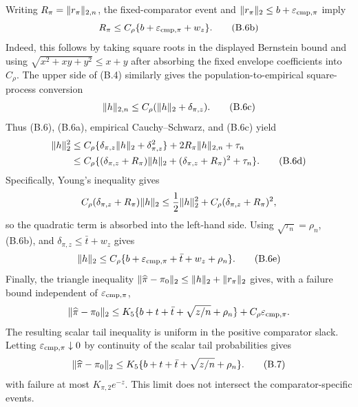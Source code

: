 Writing \(R_\pi=\lVert r_\pi\rVert_{2,n}\), the fixed-comparator event and
\(\lVert r_\pi\rVert_2\le b+\varepsilon_{\rm cmp,\pi}\) imply
\begin{equation}
 R_\pi\le C_\rho\{b+\varepsilon_{\rm cmp,\pi}+w_z\}.
 \tag{B.6b}
\end{equation}
Indeed, this follows by taking square roots in the displayed Bernstein bound
and using \(\sqrt{x^2+xy+y^2}\le x+y\) after absorbing the fixed envelope
coefficients into \(C_\rho\).  The upper side of (B.4) similarly gives the
population-to-empirical square-process conversion
\begin{equation}
 \lVert h\rVert_{2,n}\le C_\rho(\lVert h\rVert_2+\delta_{\pi,z}).
 \tag{B.6c}
\end{equation}
Thus (B.6), (B.6a), empirical Cauchy--Schwarz, and (B.6c) yield
\begin{align}
 \lVert h\rVert_2^2
 &\le C_\rho\{\delta_{\pi,z}\lVert h\rVert_2+\delta_{\pi,z}^2\}
      +2R_\pi\lVert h\rVert_{2,n}+\tau_n \nonumber\\
 &\le C_\rho\{(\delta_{\pi,z}+R_\pi)\lVert h\rVert_2
              +(\delta_{\pi,z}+R_\pi)^2+\tau_n\}.
 \tag{B.6d}
\end{align}
Specifically, Young's inequality gives
\[
 C_\rho(\delta_{\pi,z}+R_\pi)\lVert h\rVert_2
 \le \frac12\lVert h\rVert_2^2
      +C_\rho(\delta_{\pi,z}+R_\pi)^2,
\]
so the quadratic term is absorbed into the left-hand side.  Using
\(\sqrt{\tau_n}=\rho_n\), (B.6b), and
\(\delta_{\pi,z}\le\bar t+w_z\) gives
\begin{equation}
 \lVert h\rVert_2\le C_\rho\{b+\varepsilon_{\rm cmp,\pi}
                         +\bar t+w_z+\rho_n\}.
 \tag{B.6e}
\end{equation}
Finally, the triangle inequality
\(\lVert \widehat\pi-\pi_0\rVert_2\le\lVert h\rVert_2+\lVert r_\pi\rVert_2\)
gives, with a failure bound independent of
\(\varepsilon_{\rm cmp,\pi}\),
\[
 \lVert \widehat\pi-\pi_0\rVert_2
 \le K_5\{b+t+\bar t+\sqrt{z/n}+\rho_n\}
      +C_\rho\varepsilon_{\rm cmp,\pi}.
\]
The resulting scalar tail inequality is uniform in the positive comparator
slack.  Letting \(\varepsilon_{\rm cmp,\pi}\downarrow0\) by continuity of
the scalar tail probabilities gives
\begin{equation}
 \lVert \widehat\pi-\pi_0\rVert_2
 \le K_5\{b+t+\bar t+\sqrt{z/n}+\rho_n\}.
 \tag{B.7}
\end{equation}
with failure at most \(K_{\pi,2}e^{-z}\).  This limit does not intersect
the comparator-specific events.

